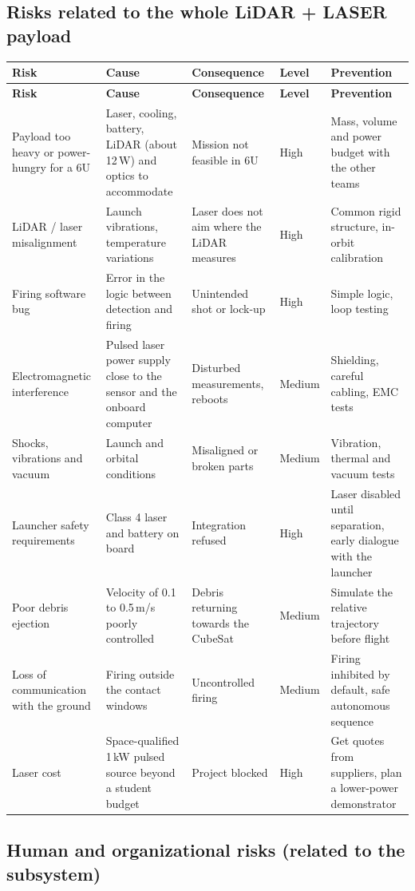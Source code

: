 \documentclass[11pt,a4paper]{article}
\newcommand{\risqueentete}{%
  \toprule
  \textbf{Risk} & \textbf{Cause} & \textbf{Consequence} & \textbf{Level} & \textbf{Prevention} \\
  \midrule
  \endfirsthead
  \toprule
  \textbf{Risk} & \textbf{Cause} & \textbf{Consequence} & \textbf{Level} & \textbf{Prevention} \\
  \midrule
  \endhead
  \bottomrule
  \endfoot
}
\begin{document}
\subsection{Risks related to the whole LiDAR + LASER payload}

\begin{longtable}{>{\raggedright\arraybackslash}p{3.7cm} >{\raggedright\arraybackslash}p{4.2cm} >{\raggedright\arraybackslash}p{3.7cm} >{\centering\arraybackslash}p{1.4cm} >{\raggedright\arraybackslash}p{4.0cm}}
\risqueentete
Payload too heavy or power-hungry for a 6U & Laser, cooling, battery, LiDAR (about 12\,W) and optics to accommodate & Mission not feasible in 6U & High & Mass, volume and power budget with the other teams \\
LiDAR / laser misalignment & Launch vibrations, temperature variations & Laser does not aim where the LiDAR measures & High & Common rigid structure, in-orbit calibration \\
Firing software bug & Error in the logic between detection and firing & Unintended shot or lock-up & High & Simple logic, loop testing \\
Electromagnetic interference & Pulsed laser power supply close to the sensor and the onboard computer & Disturbed measurements, reboots & Medium & Shielding, careful cabling, EMC tests \\
Shocks, vibrations and vacuum & Launch and orbital conditions & Misaligned or broken parts & Medium & Vibration, thermal and vacuum tests \\
Launcher safety requirements & Class 4 laser and battery on board & Integration refused & High & Laser disabled until separation, early dialogue with the launcher \\
Poor debris ejection & Velocity of 0.1 to 0.5\,m/s poorly controlled & Debris returning towards the CubeSat & Medium & Simulate the relative trajectory before flight \\
Loss of communication with the ground & Firing outside the contact windows & Uncontrolled firing & Medium & Firing inhibited by default, safe autonomous sequence \\
Laser cost & Space-qualified 1\,kW pulsed source beyond a student budget & Project blocked & High & Get quotes from suppliers, plan a lower-power demonstrator \\
\end{longtable}



\subsection{Human and organizational risks (related to the subsystem)}
\end{document}
